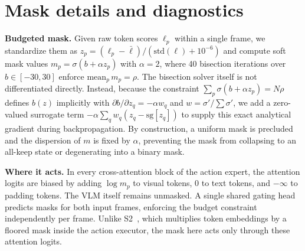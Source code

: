 \FloatBarrier
\section{Mask details and diagnostics}
\label{app:mask}
\textbf{Budgeted mask.} Given raw token scores $\ell_p$ within a single frame, we standardize them as $z_p=(\ell_p-\bar\ell)/(\mathrm{std}(\ell)+10^{-6})$ and compute soft mask values $m_p=\sigma(b+\alpha z_p)$ with $\alpha=2$, where 40 bisection iterations over $b\in[-30,30]$ enforce $\mathrm{mean}_p\,m_p=\rho$. The bisection solver itself is not differentiated directly. Instead, because the constraint $\sum_p\sigma(b+\alpha z_p)=N\rho$ defines $b(z)$ implicitly with $\partial b/\partial z_q=-\alpha w_q$ and $w=\sigma'/\sum\sigma'$, we add a zero-valued surrogate term $-\alpha\sum_q w_q(z_q-\mathrm{sg}[z_q])$ to supply this exact analytical gradient during backpropagation. By construction, a uniform mask is precluded and the dispersion of $m$ is fixed by $\alpha$, preventing the mask from collapsing to an all-keep state or degenerating into a binary mask.

\textbf{Where it acts.} In every cross-attention block of the action expert, the attention logits are biased by adding $\log m_p$ to visual tokens, $0$ to text tokens, and $-\infty$ to padding tokens. The VLM itself remains unmasked. A single shared gating head predicts masks for both input frames, enforcing the budget constraint independently per frame. Unlike S2~\cite{seeless}, which multiplies token embeddings by a floored mask inside the action executor, the mask here acts only through these attention logits.

